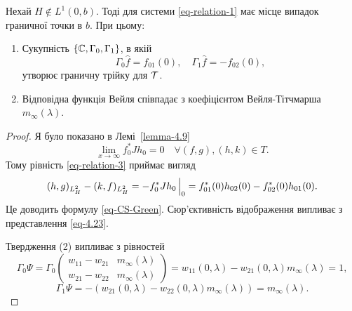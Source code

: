 \begin{theorem}\label{th-4.10}
	Нехай $H\notin L^1(0,b)$. Тоді для системи \eqref{eq-relation-1} має місце випадок граничної точки в $b$. При цьому:
	\begin{enumerate}
		\item Сукупність $\{\mathbb{C},\Gamma_0,\Gamma_1\}$, в якій
		\begin{equation}\label{eq-4.24}
			\Gamma_0\widehat{f}=f_{01}(0),\quad \Gamma_1\widehat{f} = -f_{02}(0),
		\end{equation}
		утворює граничну трійку для $\mathcal{T}$.
		\item Відповідна функція Вейля співпадає з коефіцієнтом Вейля-Тітчмарша $m_\infty(\lambda)$.
	\end{enumerate}
\end{theorem}
\begin{proof}
	Я було показано в Лемі~\ref{lemma-4.9}
	\begin{equation*}
		\lim_{x\to\infty} f_0^*Jh_0 = 0 \quad \forall (f,g), (h,k)\in T.
	\end{equation*}
	Тому рівність \eqref{eq-relation-3} приймає вигляд
	\begin{equation}
		(h,g)_{L^2_H} - (k,f)_{L^2_H} =\Bigl. -f^*_0Jh_0\, \Bigr|_0 = f^*_{01}(0)h_{02}(0) - f^*_{02}(0)h_{01}(0).
	\end{equation}
	Це доводить формулу \eqref{eq-CS-Green}. Сюр'єктивність відображення випливає з представлення \eqref{eq-4.23}.

	Твердження (2) випливає з рівностей
	\begin{equation*}
		\Gamma_0\Psi = \Gamma_0
		\begin{pmatrix}
			w_{11}-w_{21} & m_\infty(\lambda) \\
			w_{21}-w_{22} & m_\infty(\lambda)
		\end{pmatrix}
		=w_{11}(0,\lambda) - w_{21}(0,\lambda)m_\infty(\lambda) = 1,
	\end{equation*}
	\begin{equation*}
		\Gamma_1\Psi = -(w_{21}(0,\lambda)-w_{22}(0,\lambda)m_\infty(\lambda)) = m_\infty(\lambda).
	\end{equation*}
\end{proof}


